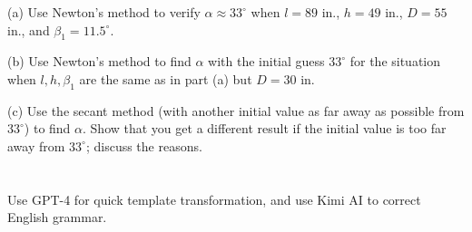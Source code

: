 \documentclass[a4paper]{article}
\begin{document}
(a) Use Newton's method to verify $\alpha \approx 33^{\circ}$ when $l = 89$ in., $h = 49$ in., $D = 55$ in., and $\beta_1 = 11.5^{\circ}$.

(b) Use Newton's method to find $\alpha$ with the initial guess $33^{\circ}$ for the situation when $l, h, \beta_1$ are the same as in part (a) but $D = 30$ in.

(c) Use the secant method (with another initial value as far away as possible from $33^{\circ}$) to find $\alpha$. Show that you get a different result if the initial value is too far away from $33^{\circ}$; discuss the reasons.



\section*{  }
Use GPT-4 for quick template transformation, and use Kimi AI to correct English grammar.
\end{document}
